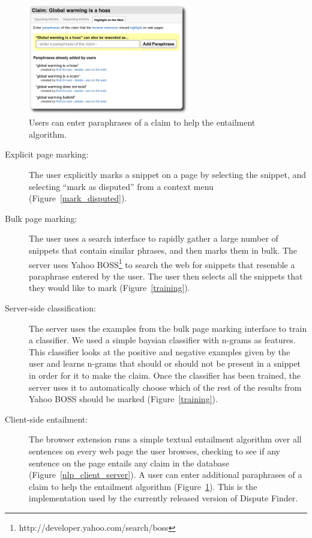 \documentclass{www2010-submission}
\newcommand{\todo}[1]{}
\begin{document}
\begin{figure}[tb]
	\begin{center}
	\includegraphics[width=7cm]{pictures/paraphrases.png}
	\caption{Users can enter paraphrases of a claim to help the entailment algorithm.}
	\label{paraphrases}
	\end{center}
\end{figure}

\begin{description}
\item[Explicit page marking:] The user explicitly marks a snippet on a page by selecting the snippet, and selecting ``mark as disputed'' from a context menu (Figure~\ref{mark_disputed}).

\item[Bulk page marking:] The user uses a search interface to rapidly gather a large number of snippets that contain similar phrases, and then marks them in bulk. The server uses Yahoo BOSS\footnote{http://developer.yahoo.com/search/boss} to search the web for snippets that resemble a paraphrase entered by the user. The user then selects all the snippets that they would like to mark (Figure~\ref{training}).

\item[Server-side classification:] The server uses the examples from the bulk page marking interface to train a classifier. We used a simple baysian classifier with n-grams as features. This classifier looks at the positive and negative examples given by the user and learns n-grams that should or should not be present in a snippet in order for it to make the claim.  Once the classifier has been trained, the server uses it to automatically choose which of the rest of the results from Yahoo BOSS should be marked (Figure~\ref{training}).

\todo{Should we say that we didn't completely finish this version?}

\todo{Has anyone done something like this before.}
\todo{We only partially implemented this approach}

\item[Client-side entailment:] The browser extension runs a simple textual entailment algorithm over all sentences on every web page the user browses, checking to see if any sentence on the page entails any claim in the database (Figure~\ref{nlp_client_server}). A user can enter additional paraphrases of a claim to help the entailment algorithm (Figure~\ref{paraphrases}). This is the implementation used by the currently released version of Dispute Finder.
\end{description}
\end{document}
